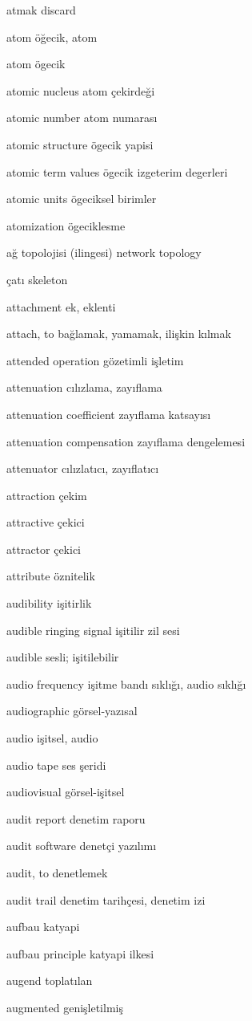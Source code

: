 \documentclass[12pt,fleqn]{article}\usepackage{../../common}
\begin{document}
atmak discard

atom öğecik, atom

atom ögecik

atomic nucleus atom çekirdeği

atomic number atom numarası

atomic structure ögecik yapisi

atomic term values ögecik izgeterim degerleri

atomic units ögeciksel birimler

atomization ögeciklesme

ağ topolojisi (ilingesi) network topology

çatı skeleton

attachment ek, eklenti

attach, to bağlamak, yamamak, ilişkin kılmak

attended operation gözetimli işletim

attenuation cılızlama, zayıflama

attenuation coefficient zayıflama katsayısı

attenuation compensation zayıflama dengelemesi

attenuator cılızlatıcı, zayıflatıcı

attraction çekim

attractive çekici

attractor çekici

attribute öznitelik

audibility işitirlik

audible ringing signal işitilir zil sesi

audible sesli; işitilebilir

audio frequency işitme bandı sıklığı, audio sıklığı

audiographic görsel-yazısal

audio işitsel, audio

audio tape ses şeridi

audiovisual görsel-işitsel

audit report denetim raporu

audit software denetçi yazılımı

audit, to denetlemek

audit trail denetim tarihçesi, denetim izi

aufbau katyapi

aufbau principle katyapi ilkesi

augend toplatılan

augmented genişletilmiş
\end{document}
